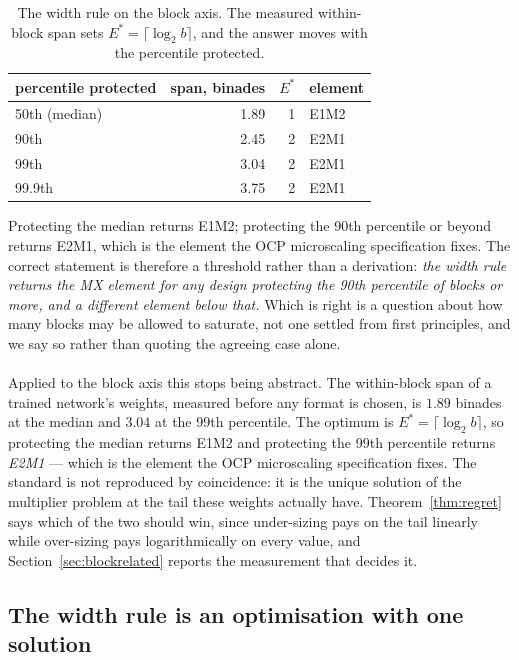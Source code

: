 \documentclass[11pt]{article}
\theoremstyle{definition}
\begin{document}
\begin{table}[t]\centering
\caption{The width rule on the block axis. The measured within-block span sets
$E^{*} = \lceil \log_2 b \rceil$, and the answer moves with the percentile
protected.}
\label{tab:blockpct}
\begin{tabular}{lrrl}
\toprule
percentile protected & span, binades & $E^{*}$ & element \\
\midrule
50th (median) & 1.89 & 1 & E1M2 \\
90th & 2.45 & 2 & E2M1 \\
99th & 3.04 & 2 & E2M1 \\
99.9th & 3.75 & 2 & E2M1 \\
\bottomrule
\end{tabular}
\end{table}

Protecting the median returns E1M2; protecting the 90th percentile or beyond
returns E2M1, which is the element the OCP microscaling specification fixes. The
correct statement is therefore a threshold rather than a derivation: \emph{the
width rule returns the MX element for any design protecting the 90th percentile
of blocks or more, and a different element below that.} Which is right is a
question about how many blocks may be allowed to saturate, not one settled from
first principles, and we say so rather than quoting the agreeing case alone.

\paragraph{} Applied to the block axis this stops being
abstract. The within-block span of a trained network's weights, measured before
any format is chosen, is $1.89$ binades at the median and $3.04$ at the 99th
percentile. The optimum is $E^{*} = \lceil \log_2 b \rceil$, so protecting the
median returns E1M2 and protecting the 99th percentile returns \emph{E2M1} ---
which is the element the OCP microscaling specification fixes. The standard is not
reproduced by coincidence: it is the unique solution of the multiplier problem at
the tail these weights actually have. Theorem~\ref{thm:regret} says which of the
two should win, since under-sizing pays on the tail linearly while over-sizing pays
logarithmically on every value, and Section~\ref{sec:blockrelated} reports the
measurement that decides it.


\subsection{The width rule is an optimisation with one solution}
\label{sec:widthrule}
\end{document}
